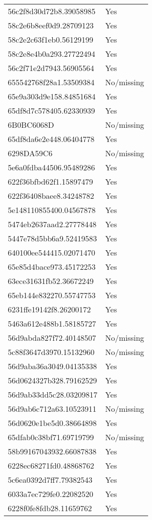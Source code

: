 \begin{tabular}{ll}
56c2f8d30d72b8.39058985 & Yes \\
58c2e6b8eef0d9.28709123 & Yes \\
58c2e2c63f1eb0.56129199 & Yes \\
58c2e8e4b0a293.27722494 & Yes \\
56c2f71e2d7943.56905564 & Yes \\
655542768f28a1.53509384 & No/missing \\
65e9a303d9e158.84851684 & Yes \\
65df8d7c578405.62330939 & Yes \\
6B0BC6068D & No/missing \\
65df8da6e2e448.06404778 & Yes \\
6298DA59C6 & No/missing \\
5e6a0fdba44506.95489286 & Yes \\
622f36bfbd62f1.15897479 & Yes \\
622f36408baee8.34248782 & Yes \\
5e148110855400.04567878 & Yes \\
5474eb2637aad2.27778448 & Yes \\
5447e78d5bb6a9.52419583 & Yes \\
640100ee544415.02071470 & Yes \\
65e85d4bace973.45172253 & Yes \\
63ece31631fb52.36672249 & Yes \\
65eb144e832270.55747753 & Yes \\
6231ffe19142f8.26200172 & Yes \\
5463a612e488b1.58185727 & Yes \\
56d9abda827f72.40148507 & No/missing \\
5c88f3647d3970.15132960 & No/missing \\
56d9aba36a3049.04135338 & Yes \\
56d0624327b328.79162529 & Yes \\
56d9ab33dd5c28.03209817 & Yes \\
56d9ab6c712a63.10523911 & No/missing \\
56d0620e1be5d0.38664898 & Yes \\
65dfab0c38bf71.69719799 & No/missing \\
58b99167043932.66087838 & Yes \\
6228ec68271fd0.48868762 & Yes \\
5c6ea0392d7ff7.79382543 & Yes \\
6033a7ec729fe0.22082520 & Yes \\
6228f0fe8fdb28.11659762 & Yes \\

\end{tabular}
